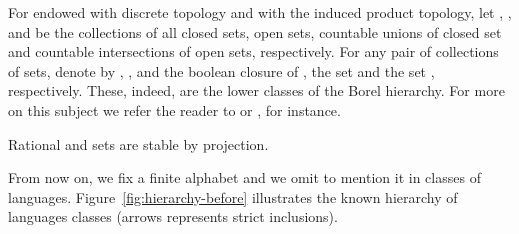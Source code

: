 \documentclass[preprint]{elsarticle}
\begin{document}
For  endowed with discrete topology and
 with the induced product topology, let , ,  and  be the collections of all closed sets, open sets, countable unions of closed set and countable intersections of open sets, respectively. For any pair  of collections of sets, denote by , , and  the  boolean closure of , the set  and the set , respectively.
These, indeed, are the lower classes of the Borel hierarchy. For more on this subject we refer the reader
to \cite{Wagner1979} or \cite{perrin2004}, for instance.

\begin{remark}
Rational and  sets are stable by projection.
\end{remark}

From now on, we fix a finite alphabet  and we omit to mention it in classes of languages.
Figure~\ref{fig:hierarchy-before} illustrates the known hierarchy of languages classes (arrows represents strict inclusions).
\end{document}
